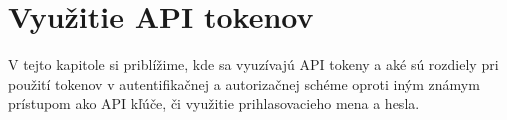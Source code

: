 \chapter{Využitie API tokenov}

\label{kap:vyuzitie} %

V tejto kapitole si priblížime, kde sa vyuzívajú API tokeny a aké sú rozdiely pri použití tokenov v autentifikačnej a autorizačnej schéme oproti iným známym prístupom ako API kľúče, či využitie prihlasovacieho mena a hesla.
